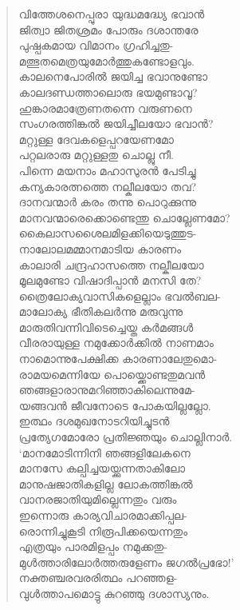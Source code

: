 \begin{verse}
വിത്തേശനെപ്പുരാ യുദ്ധമദ്ധ്യേ ഭവാന്‍\\
ജിത്വാ ജിതശ്രമം പോരും ദശാന്തരേ\\
പുഷ്പകമായ വിമാനം ഗ്രഹിച്ചതു-\\
മത്ഭുതമെത്രയുമോര്‍ത്തുകണ്ടോളവും.\\
കാലനെപോരില്‍ ജയിച്ച ഭവാനുണ്ടോ\\
കാലദണ്ഡത്താലൊരു ഭയമുണ്ടാവൂ?\\
ഹുങ്കാരമാത്രേണതന്നെ വരുണനെ\\
സംഗരത്തിങ്കല്‍ ജയിച്ചീലയോ ഭവാന്‍?\\
മറ്റുള്ള ദേവകളെപ്പറയേണമോ\\
പറ്റലരാരു മറ്റുള്ളതു ചൊല്ലു നീ.\\
പിന്നെ മയനാം മഹാസുരന്‍ പേടിച്ചു\\
കന്യകാരത്നത്തെ നല്കീലയോ തവ?\\
ദാനവന്മാര്‍ കരം തന്നു പൊറുക്കുന്നു\\
മാനവന്മാരെക്കൊണ്ടെന്തു ചൊല്ലേണമോ?\\
കൈലാസശൈലമിളക്കിയെടുത്തുട-\\
നാലോലമമ്മാനമാടിയ കാരണം\\
കാലാരി ചന്ദ്രഹാസത്തെ നല്കീലയോ\\
മൂലമുണ്ടോ വിഷാദിപ്പാന്‍ മനസി തേ?\\
ത്രൈലോക്യവാസികളെല്ലാം ഭവല്‍ബല-\\
മാലോക്യ ഭീതികലര്‍ന്നു മരുവുന്നു\\
മാരുതിവന്നിവിടെച്ചെയ്ത കര്‍മങ്ങള്‍\\
വീരരായുള്ള നമുക്കോര്‍ക്കില്‍ നാണമാം\\
നാമൊന്നുപേക്ഷിക്ക കാരണാലേതുമൊ-\\
രാമയമെന്നിയേ പൊയ്ക്കൊണ്ടതുമവന്‍\\
ഞങ്ങളാരാനുമറിഞ്ഞാകിലെന്നുമേ-\\
യങ്ങവന്‍ ജീവനോടെ പോകയില്ലല്ലോ.\\
ഇത്ഥം ദശമുഖനോടറിയിച്ചുടന്‍\\
പ്രത്യേഗമോരോ പ്രതിജ്ഞയും ചൊല്ലിനാര്‍.\\
‘മാനമോടിന്നിനി ഞങ്ങളിലേകനെ\\
മാനസേ കല്പിച്ചയയ്ക്കുന്നതാകിലോ\\
മാനുഷജാതികളില്ല ലോകത്തിങ്കല്‍\\
വാനരജാതിയുമില്ലെന്നതും വരും\\
ഇന്നൊരു കാര്യവിചാരമാക്കിപ്പല-\\
രൊന്നിച്ചുകൂടി നിരൂപിക്കയെന്നതും\\
എത്രയും പാരമിളപ്പം നമുക്കതു-\\
മുള്‍ത്താരിലോര്‍ത്തരുളേണം ജഗല്‍പ്രഭോ!’\\
നക്തഞ്ചരവരരിത്ഥം പറഞ്ഞള-\\
വുള്‍ത്താപമൊട്ടു കുറഞ്ഞു ദശാസ്യനും.
\end{verse}

